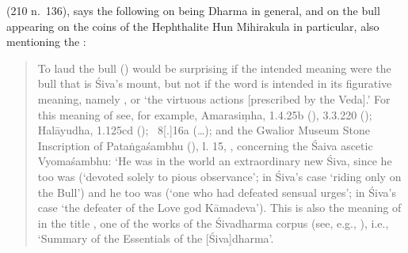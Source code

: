 
\noindent
{} (210 n.~136), 
says the following on  being Dharma
in general, and on the bull appearing on the coins of the 
Hephthalite Hun Mihirakula in particular, also
mentioning the \VSS: 

\begin{quote}
To laud the bull () 
would be surprising if the intended meaning were 
the bull that is Śiva's mount, but not if the word is intended in its figurative meaning, namely , 
or  `the virtuous actions [prescribed by
the Veda].' For this meaning of  see, for example,
Amarasiṃha,  
1.4.25b (),
3.3.220 (); 
Halāyudha,
 1.125cd (); 
\Manu\ 8[.]16a
(\dots); 
and the Gwalior Museum Stone
Inscription of Pataṅgaśambhu (), l. 15,
, 
concerning the Śaiva ascetic Vyomaśambhu: 
`He was in the
world an extraordinary new Śiva, since he too was 
(`devoted solely to pious observance'; 
in Śiva's case `riding only on the Bull') and he too was 
 (`one who had defeated sensual
urges'; in Śiva's case `the defeater of the Love god Kāmadeva'). 
This is also the meaning of  in the title \Vss,
one of the works of the Śivadharma corpus 
(see, e.g., ), i.e., 
`Summary of the Essentials of the [Śiva]dharma'. 
\end{quote}

